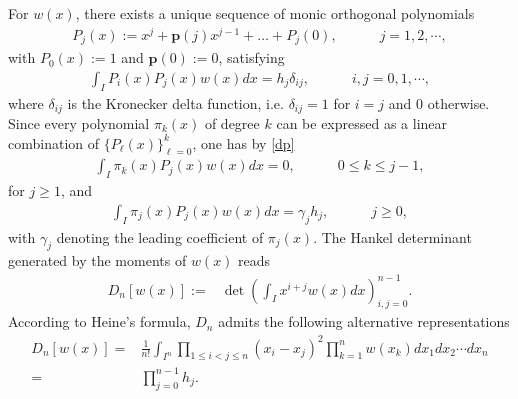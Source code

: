 \documentclass[12pt,a4paper]{article}    %
\numberwithin{equation}{section}
\begin{document}
For $w(x)$, there exists a unique sequence of monic orthogonal polynomials \cite[Theorem 2.1.1]{Ismail}
\begin{align}\label{mp}
P_j(x):=x^j+\textbf{p}(j)x^{j-1}+\dots+P_j(0),\quad\qquad j=1,2,\cdots,
\end{align}
with $P_0(x):=1$ and $\textbf{p}(0):=0$, satisfying
\begin{align}\label{dp}	 \int_{I}P_i(x)P_j(x)w(x)dx=h_j\delta_{ij},\quad\qquad i,j=0,1,\cdots,
\end{align}
where $\delta_{ij}$ is the Kronecker delta function, i.e. $\delta_{ij}=1$ for $i=j$ and $0$ otherwise. Since every polynomial $\pi_k(x)$ of degree $k$ can be expressed as a linear combination of $\{P_{\ell}(x)\}_{\ell=0}^{k}$, one has by \eqref{dp}
\begin{align}\label{or-1}
\int_I\pi_k(x)P_{j}(x)w(x)dx=0, \quad\qquad 0\leq k\leq j-1,
\end{align}
for $j\geq1$, and
\begin{align}\label{or-2}
\int_I\pi_j(x)P_{j}(x)w(x)dx=\gamma_jh_{j},\quad\qquad j\geq0,
\end{align}
with $\gamma_j$ denoting the leading coefficient of $\pi_j(x)$.
The Hankel determinant generated by the moments of $w(x)$ reads
\begin{align*}\label{D_nh_n}
D_n[w(x)]:=&\det \left( \int_Ix^{i+j}w(x)dx\right) _{i,j=0}^{n-1}.
\end{align*}
According to Heine's formula, $D_n$ admits the following alternative representations \cite[Section 2.1]{Ismail}
\begin{align*}
D_n[w(x)]=&\frac{1}{n!}\int_{I^n}\prod_{1\leq i<j\leq n}(x_i-x_j)^2\prod_{k=1}^n w(x_k)dx_1dx_2\cdots dx_n\\
=&\prod_{j=0}^{n-1}h_j.
\end{align*}
\end{document}
